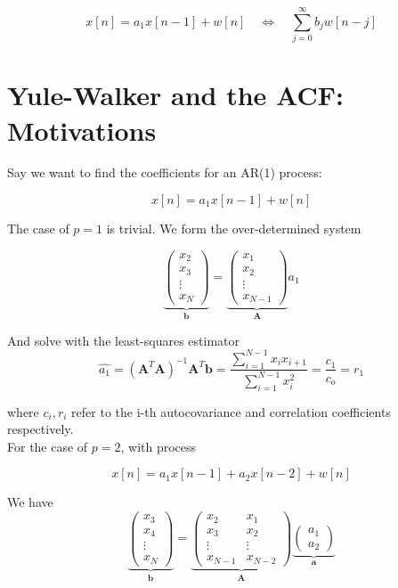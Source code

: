 \begin{equation}
    x[n]=a_1x[n-1]+w[n]\quad\Leftrightarrow\quad\sum_{j=0}^\infty b_jw[n-j]
\end{equation}

\section{Yule-Walker and the ACF: Motivations}
Say we want to find the coefficients for an AR(1) process:

\begin{equation}
     x[n] = a_1x[n-1] + w[n]
\end{equation}

The case of $p=1$ is trivial. We form the over-determined system

\begin{equation}
    \underbrace{\begin{pmatrix}
x_2 \\
x_3 \\
\vdots \\
x_N
\end{pmatrix}}_{\mathbf{b}} =
\underbrace{\begin{pmatrix}
x_1 \\
x_2 \\
\vdots \\
x_{N-1}
\end{pmatrix}}_{\mathbf{A}} a_1
\end{equation}

And solve with the least-squares estimator
\begin{equation}
\hat{a_1}=\left(\mathbf{A}^T\mathbf{A}\right)^{-1}\mathbf{A}^T\mathbf{b}=\frac{\sum_{i=1}^{N-1}x_ix_{i+1}}{\sum_{i=1}^{N-1}x_i^2}=\frac{c_1}{c_o}=r_1
\end{equation}

where $c_i, r_i$ refer to the i-th autocovariance and correlation coefficients respectively.\\

For the case of $p=2$, with process 

\begin{equation}
     x[n] = a_1x[n-1] + a_2x[n-2] + w[n]
\end{equation}

We have 
\begin{equation}
\underbrace{\begin{pmatrix}
x_3 \\
x_4 \\
\vdots \\
x_N
\end{pmatrix}}_{\mathbf{b}} = \underbrace{\begin{pmatrix}
x_2 & x_1 \\
x_3 & x_2 \\
\vdots & \vdots \\
x_{N-1} & x_{N-2}
\end{pmatrix}}_{\mathbf{A}}
\underbrace{\begin{pmatrix}
a_1 \\
a_2
\end{pmatrix}}_{\mathbf{a}}
\end{equation}

